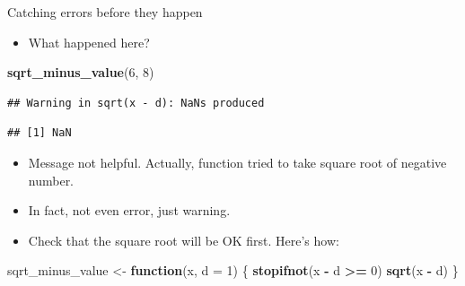 \documentclass[
  ignorenonframetext,
]{beamer}
\newenvironment{Shaded}{\begin{snugshade}}{\end{snugshade}}
\newcommand{\ControlFlowTok}[1]{\textcolor[rgb]{0.13,0.29,0.53}{\textbf{#1}}}
\newcommand{\DataTypeTok}[1]{\textcolor[rgb]{0.13,0.29,0.53}{#1}}
\newcommand{\DecValTok}[1]{\textcolor[rgb]{0.00,0.00,0.81}{#1}}
\newcommand{\KeywordTok}[1]{\textcolor[rgb]{0.13,0.29,0.53}{\textbf{#1}}}
\newcommand{\NormalTok}[1]{#1}
\newcommand{\OperatorTok}[1]{\textcolor[rgb]{0.81,0.36,0.00}{\textbf{#1}}}
\newcommand{\StringTok}[1]{\textcolor[rgb]{0.31,0.60,0.02}{#1}}
\providecommand{\tightlist}{%
  \setlength{\itemsep}{0pt}\setlength{\parskip}{0pt}}
\begin{document}
\begin{frame}[fragile]{Catching errors before they happen}
\protect\hypertarget{catching-errors-before-they-happen}{}

\begin{itemize}
\tightlist
\item
  What happened here?
\end{itemize}

\begin{Shaded}
\begin{Highlighting}[]
\KeywordTok{sqrt_minus_value}\NormalTok{(}\DecValTok{6}\NormalTok{, }\DecValTok{8}\NormalTok{)}
\end{Highlighting}
\end{Shaded}

\begin{verbatim}
## Warning in sqrt(x - d): NaNs produced
\end{verbatim}

\begin{verbatim}
## [1] NaN
\end{verbatim}

\begin{itemize}
\tightlist
\item
  Message not helpful. Actually, function tried to take square root of
  negative number.
\item
  In fact, not even error, just warning.
\item
  Check that the square root will be OK first. Here's how:
\end{itemize}

\begin{Shaded}
\begin{Highlighting}[]
\NormalTok{sqrt_minus_value <-}\StringTok{ }\ControlFlowTok{function}\NormalTok{(x, }\DataTypeTok{d =} \DecValTok{1}\NormalTok{) \{}
  \KeywordTok{stopifnot}\NormalTok{(x }\OperatorTok{-}\StringTok{ }\NormalTok{d }\OperatorTok{>=}\StringTok{ }\DecValTok{0}\NormalTok{)}
  \KeywordTok{sqrt}\NormalTok{(x }\OperatorTok{-}\StringTok{ }\NormalTok{d)}
\NormalTok{\}}
\end{Highlighting}
\end{Shaded}

\end{frame}
\end{document}
